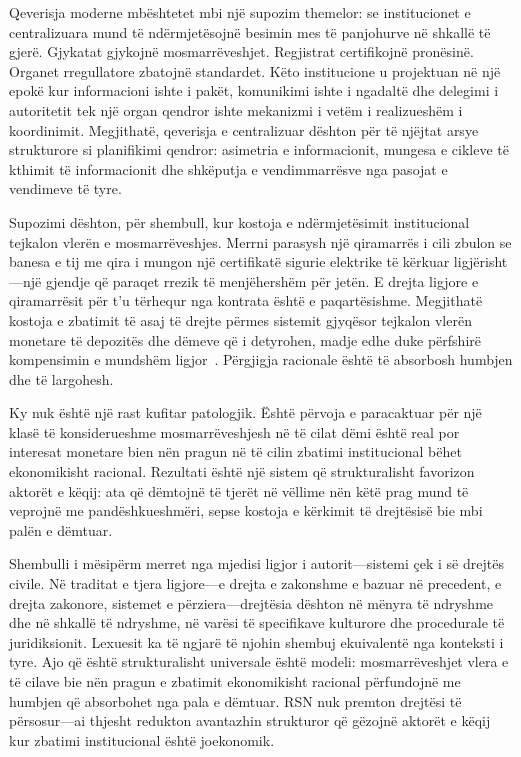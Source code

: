 \documentclass[11pt,a4paper,twocolumn]{article}
\begin{document}
Qeverisja moderne mbështetet mbi një supozim themelor: se institucionet e centralizuara mund të ndërmjetësojnë besimin mes të panjohurve në shkallë të gjerë. Gjykatat gjykojnë mosmarrëveshjet. Regjistrat certifikojnë pronësinë. Organet rregullatore zbatojnë standardet. Këto institucione u projektuan në një epokë kur informacioni ishte i pakët, komunikimi ishte i ngadaltë dhe delegimi i autoritetit tek një organ qendror ishte mekanizmi i vetëm i realizueshëm i koordinimit. Megjithatë, qeverisja e centralizuar dështon për të njëjtat arsye strukturore si planifikimi qendror: asimetria e informacionit, mungesa e cikleve të kthimit të informacionit dhe shkëputja e vendimmarrësve nga pasojat e vendimeve të tyre.

Supozimi dështon, për shembull, kur kostoja e ndërmjetësimit institucional tejkalon vlerën e mosmarrëveshjes. Merrni parasysh një qiramarrës i cili zbulon se banesa e tij me qira i mungon një certifikatë sigurie elektrike të kërkuar ligjërisht---një gjendje që paraqet rrezik të menjëhershëm për jetën. E drejta ligjore e qiramarrësit për t'u tërhequr nga kontrata është e paqartësishme. Megjithatë kostoja e zbatimit të asaj të drejte përmes sistemit gjyqësor tejkalon vlerën monetare të depozitës dhe dëmeve që i detyrohen, madje edhe duke përfshirë kompensimin e mundshëm ligjor~\cite{czcourtfees}. Përgjigja racionale është të absorbosh humbjen dhe të largohesh.

Ky nuk është një rast kufitar patologjik. Është përvoja e paracaktuar për një klasë të konsiderueshme mosmarrëveshjesh në të cilat dëmi është real por interesat monetare bien nën pragun në të cilin zbatimi institucional bëhet ekonomikisht racional. Rezultati është një sistem që strukturalisht favorizon aktorët e këqij: ata që dëmtojnë të tjerët në vëllime nën këtë prag mund të veprojnë me pandëshkueshmëri, sepse kostoja e kërkimit të drejtësisë bie mbi palën e dëmtuar.

Shembulli i mësipërm merret nga mjedisi ligjor i autorit---sistemi çek i së drejtës civile. Në traditat e tjera ligjore---e drejta e zakonshme e bazuar në precedent, e drejta zakonore, sistemet e përziera---drejtësia dështon në mënyra të ndryshme dhe në shkallë të ndryshme, në varësi të specifikave kulturore dhe procedurale të juridiksionit. Lexuesit ka të ngjarë të njohin shembuj ekuivalentë nga konteksti i tyre. Ajo që është strukturalisht universale është modeli: mosmarrëveshjet vlera e të cilave bie nën pragun e zbatimit ekonomikisht racional përfundojnë me humbjen që absorbohet nga pala e dëmtuar. RSN nuk premton drejtësi të përsosur---ai thjesht redukton avantazhin strukturor që gëzojnë aktorët e këqij kur zbatimi institucional është joekonomik.
\end{document}
